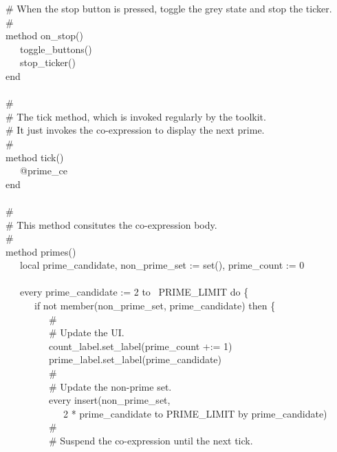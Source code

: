 {\>   \# When the stop button is pressed, toggle the grey state and stop the ticker. \\
\>   \#  \\
\>   method on\_stop() \\
\>   \ \ \ toggle\_buttons() \\
\>   \ \ \ stop\_ticker() \\
\>   end \\
\ \\
\>   \# \\
\>   \# The tick method, which is invoked regularly by the toolkit. \\
\>   \# It just invokes the co-expression to display the next prime. \\
\>   \# \\
\>   method tick() \\
\>   \ \ \ @prime\_ce \\
\>   end \\
\ \\
\>   \# \\
\>   \# This method consitutes the co-expression body. \\
\>   \# \\
\>   method primes() \\
\>   \ \ \ local prime\_candidate, non\_prime\_set := set(), prime\_count := 0 \\
\ \\
\>   \ \ \ every prime\_candidate := 2 to \ PRIME\_LIMIT do \{ \\
\>   \ \ \ \ \ \ if not member(non\_prime\_set, prime\_candidate) then
\{ \\
\>   \ \ \ \ \ \ \ \ \ \# \\
\>   \ \ \ \ \ \ \ \ \ \# Update the UI. \\
\>   \ \ \ \ \ \ \ \ \ count\_label.set\_label(prime\_count +:= 1) \\
\>   \ \ \ \ \ \ \ \ \ prime\_label.set\_label(prime\_candidate) \\
\>   \ \ \ \ \ \ \ \ \ \# \\
\>   \ \ \ \ \ \ \ \ \ \# Update the non-prime set. \\
\>   \ \ \ \ \ \ \ \ \ every insert(non\_prime\_set,\\
\>   \ \ \ \ \ \ \ \ \ \ \ \ 2 * prime\_candidate to PRIME\_LIMIT by prime\_candidate) \\
\>   \ \ \ \ \ \ \ \ \ \# \\
\>   \ \ \ \ \ \ \ \ \ \# Suspend the co-expression until the next tick. \\
}
